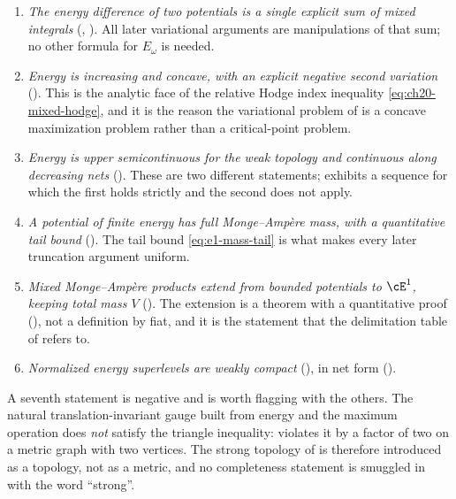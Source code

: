 \begin{enumerate}
\item\label{itm:ch26-payoff:cocycle}
 \emph{The energy difference of two potentials is a single explicit sum of
 mixed integrals} (,
 ).  All later variational arguments
 are manipulations of that sum; no other formula for \(E_\omega\) is needed.
\item\label{itm:ch26-payoff:concave}
 \emph{Energy is increasing and concave, with an explicit negative second
 variation} ().  This is the analytic face
 of the relative Hodge index inequality
 \eqref{eq:ch20-mixed-hodge}, and it is the reason the variational problem of
  is a concave maximization problem
 rather than a critical-point problem.
\item\label{itm:ch26-payoff:usc}
 \emph{Energy is upper semicontinuous for the weak topology and continuous
 along decreasing nets} ().  These are two
 different statements;  exhibits a sequence for
 which the first holds strictly and the second does not apply.
\item\label{itm:ch26-payoff:full-mass}
 \emph{A potential of finite energy has full Monge--Amp\`ere mass, with a
 quantitative tail bound} ().  The tail bound
 \eqref{eq:e1-mass-tail} is what makes every later truncation argument
 uniform.
\item\label{itm:ch26-payoff:mixed}
 \emph{Mixed Monge--Amp\`ere products extend from bounded potentials to
 \(\cE^1\), keeping total mass \(V\)}
 ().  The extension is a theorem with a
 quantitative proof (), not a definition by fiat,
 and it is the statement that the delimitation table of
  refers to.
\item\label{itm:ch26-payoff:compact}
 \emph{Normalized energy superlevels are weakly compact}
 (), in net form
 ().
\end{enumerate}

A seventh statement is negative and is worth flagging with the others.  The
natural translation-invariant gauge built from energy and the maximum
operation does \emph{not} satisfy the triangle inequality:
 violates it by a factor of two on a metric
graph with two vertices.  The strong topology of
 is therefore introduced as a topology, not as a
metric, and no completeness statement is smuggled in with the word
``strong''.

